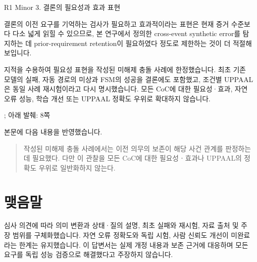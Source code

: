 \begin{reviewitem}{R1 Minor 3. 결론의 필요성과 효과 표현}

\begin{reviewercomment}

결론의 이전 요구를 기억하는 검사가 필요하고 효과적이라는 표현은 현재 증거 수준보다 다소 넓게 읽힐 수 있으므로, 본 연구에서 정의한 cross-event synthetic error를 탐지하는 데 prior-requirement retention이 필요하였다 정도로 제한하는 것이 더 적절해 보입니다.

\end{reviewercomment}

\begin{authorresponse}

지적을 수용하여 필요성 표현을 작성된 미해제 충돌 사례에 한정했습니다. 최초 기존 모델의 실패, 자동 경로의 미상과 FSM의 성공을 결론에도 포함했고, 조건별 UPPAAL은 동일 사례 재시험이라고 다시 명시했습니다. 모든 CoC에 대한 필요성·효과, 자연 오류 성능, 학습 개선 또는 UPPAAL 정확도 우위로 확대하지 않습니다.

\end{authorresponse}

\begin{manuscriptrevision}{; 아래 발췌: 8쪽}

본문에 다음 내용을 반영했습니다.

\begin{quote}

작성된 미해제 충돌 사례에서는 이전 의무의 보존이 해당 사건 관계를 판정하는 데 필요했다. 다만 이 관찰을 모든 CoC에 대한 필요성ㆍ효과나 UPPAAL의 정확도 우위로 일반화하지 않는다.

\end{quote}

\end{manuscriptrevision}

\end{reviewitem}

\section*{맺음말}

심사 의견에 따라 의미 변환과 상태·질의 설명, 최초 실패와 재시험, 자료 출처 및 주장 범위를 구체화했습니다. 자연 오류 정확도와 독립 시험, 사람 신뢰도 개선이 미완료라는 한계는 유지했습니다. 이 답변서는 실제 개정 내용과 보존 근거에 대응하며 모든 요구를 독립 성능 검증으로 해결했다고 주장하지 않습니다.


